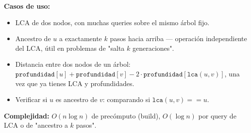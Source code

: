 \documentclass[10pt,a4paper,twocolumn]{article}
\begin{document}
\textbf{Casos de uso:}

\begin{itemize}
    \item LCA de dos nodos, con muchas queries sobre el mismo árbol
    fijo.
    \item Ancestro de $u$ a exactamente $k$ pasos hacia arriba —
    operación independiente del LCA, útil en problemas de
    "salta $k$ generaciones".
    \item Distancia entre dos nodos de un árbol:
    $\texttt{profundidad}[u] + \texttt{profundidad}[v] -
    2\cdot\texttt{profundidad}[\texttt{lca}(u,v)]$, una vez que ya
    tienes LCA y profundidades.
    \item Verificar si $u$ es ancestro de $v$: comparando si
    $\texttt{lca}(u,v) == u$.
\end{itemize}

\textbf{Complejidad:} $O(n \log n)$ de precómputo (build), $O(\log n)$
por query de LCA o de "ancestro a $k$ pasos".
\end{document}
